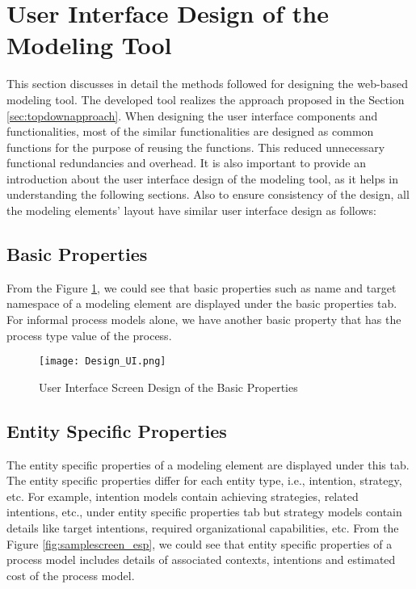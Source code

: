 \section{User Interface Design of the Modeling Tool}
\label{sec:designmethodology}
This section discusses in detail the methods followed for designing the web-based modeling tool. The developed tool realizes the approach proposed in the Section \ref{sec:topdownapproach}. When designing the user interface components and functionalities, most of the similar functionalities are designed as common functions for the purpose of reusing the functions. This reduced unnecessary functional redundancies and overhead. It is also important to provide an introduction about the user interface design of the modeling tool, as it helps in understanding the following sections. Also to ensure consistency of the design, all the modeling elements' layout have similar user interface design as follows:



\subsection{Basic Properties}
From the Figure \ref{fig:samplescreen}, we could see that basic properties such as name and target namespace of a modeling element are displayed under the basic properties tab. For informal process models alone, we have another basic property that has the process type value of the process. 

\begin{figure}[H]
	\centering
	\texttt{[image: Design\_UI.png]}
	\caption{User Interface Screen Design of the Basic Properties}
	\label{fig:samplescreen}
\end{figure}

\subsection{Entity Specific Properties}
The entity specific properties of a modeling element are displayed under this tab. The entity specific properties differ for each entity type, i.e., intention, strategy, etc. For example, intention models contain achieving strategies, related intentions, etc., under entity specific properties tab but strategy models contain details like target intentions, required organizational capabilities, etc. From the Figure \ref{fig:samplescreen_esp}, we could see that entity specific properties of a process model includes details of associated contexts, intentions and estimated cost of the process model.

